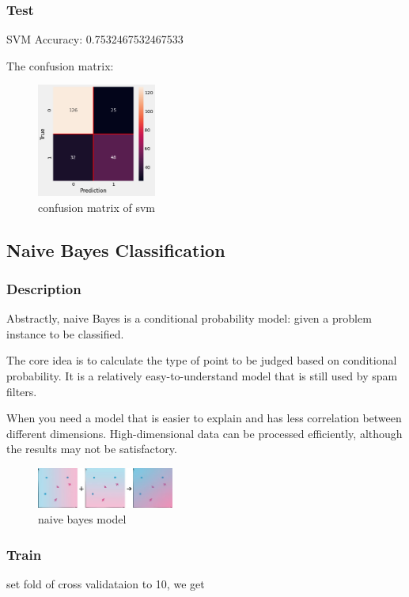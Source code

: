 \documentclass[11pt,en]{elegantpaper}
\begin{document}
\subsubsection{Test}
SVM Accuracy: 0.7532467532467533

The confusion matrix:
\begin{figure}[H]
    \centering
    \includegraphics[width=0.35\textwidth]{figure/conmat-svm.png}
    \caption{confusion matrix of svm}
\end{figure}

\subsection{Naive Bayes Classification}
\subsubsection{Description}
Abstractly, naive Bayes is a conditional probability model: given a problem instance to be classified.

The core idea is to calculate the type of point to be judged based on conditional probability.
It is a relatively easy-to-understand model that is still used by spam filters.

When you need a model that is easier to explain and has less correlation between different dimensions. High-dimensional data can be processed efficiently, although the results may not be satisfactory.

\begin{figure}[H]
    \centering
    \includegraphics[width=0.4\textwidth]{figure/nby-model}
    \caption{naive bayes model}
\end{figure}

\subsubsection{Train}
set fold of cross validataion to 10, we get
\end{document}
